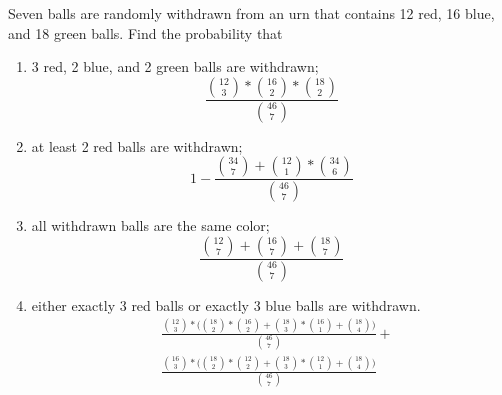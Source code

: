\item Seven balls are randomly withdrawn from an urn that contains 12 red, 16 blue, and 18 green balls. Find the probability that
\begin{enumerate}
    \item 3 red, 2 blue, and 2 green balls are withdrawn;
    \[ \frac{\binom{12}{3} * \binom{16}{2} * \binom{18}{2}}{\binom{46}{7}} \]
    \item at least 2 red balls are withdrawn;
    \[ 1 - \frac{\binom{34}{7} + \binom{12}{1} * \binom{34}{6}}{\binom{46}{7}} \]
    \item all withdrawn balls are the same color;
    \[ \frac{\binom{12}{7}+\binom{16}{7}+\binom{18}{7}}{\binom{46}{7}} \]
    \item either exactly 3 red balls or exactly 3 blue balls are withdrawn.
    \begin{align*}
        &\frac{\binom{12}{3} * \Big(\binom{18}{2}*\binom{16}{2}+\binom{18}{3}*\binom{16}{1}+\binom{18}{4}\Big)}{\binom{46}{7}} + {}\\
        &\frac{\binom{16}{3} * \Big(\binom{18}{2}*\binom{12}{2}+\binom{18}{3}*\binom{12}{1}+\binom{18}{4}\Big)}{\binom{46}{7}}
    \end{align*}
\end{enumerate}